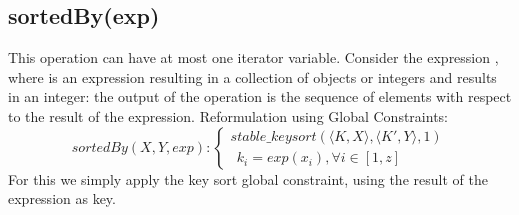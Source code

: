 \subsection{sortedBy(exp)}
This operation can have at most one iterator variable.
Consider the expression , where  is an expression resulting in a collection of objects or integers and  results in an integer: the output of the operation is the sequence of elements with respect to the result of the expression.
Reformulation using Global Constraints:
\begin{equation}\label{csp:sortedBy}
    sortedBy(X,Y,exp):
    \begin{cases}
        stable\_keysort(\langle K,X\rangle,\langle K',Y\rangle,1) \\
        ~~k_i=exp(x_i), \forall i \in [1,z]
    \end{cases}
\end{equation}
For this we simply apply the key sort global constraint, using the result of the expression as key.


